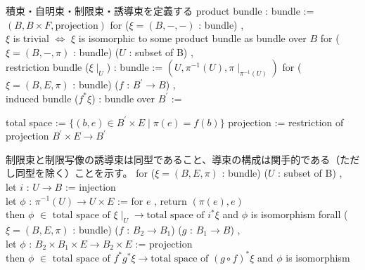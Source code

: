 \begin{Definition}
\itemnote
  積束・自明束・制限束・誘導束を定義する
\itemdefi 
  product bundle : bundle := \((B , B \times F , \text{projection})\)
\itemdefi
  for (\(\xi = (B , - , -)\) : bundle) ,\\
  \(\xi\) is trivial \(\iff\) \(\xi\) is isomorphic to some product bundle as bundle over \(B\)
\itemdefi
  for (\(\xi = (B , - , \pi)\) : bundle) (\(U\) : subset of B) ,\\
  restriction bundle (\(\xi \mid_{U}\)) : bundle := \((U , \pi^{-1}(U) , \pi \mid_{\pi^{-1}(U)})\)
\itemdefi
  for (\(\xi = (B , E , \pi)\) : bundle) (\(f\) : \(B^{\prime} \to B\)) ,\\
  induced bundle (\(f^*\xi\)) : bundle over \(B^{\prime}\) :=
  \begin{itemize}
    \itemenum total space := \(\{(b , e) \in B^{\prime} \times E \mid \pi(e) = f(b)\}\)
    \itemenum projection := restriction of projection \(B^{\prime} \times E \to B^{\prime}\)
  \end{itemize}
\end{Definition}

\begin{Theorem}
\itemnote
  制限束と制限写像の誘導束は同型であること、導束の構成は関手的である（ただし同型を除く）ことを示す。
\itemprop
  for (\(\xi = (B , E ,\pi)\) : bundle) (\(U\) : subset of B) ,\\
  let \(i\) : \(U \to B\) := injection \\
  let \(\phi\) : \(\pi^{-1}(U) \to U \times E\) := for \(e\) , return \((\pi(e) , e)\) \\
  then \(\phi\) \(\in\) \(\text{total space of } \xi \mid_{U} \to \text{total space of } i^*\xi\) and 
  \(\phi\) is isomorphism
\itemprop
  forall (\(\xi = (B , E , \pi)\) : bundle) (\(f\) : \(B_2 \to B_1\)) (\(g\) : \(B_1 \to B\)) ,\\
  let \(\phi\) : \(B_2 \times B_1 \times E \to B_2 \times E\) := projection \\
  then \(\phi\) \(\in\) \(\text{total space of } f^*g^* \xi \to \text{total space of } (g \circ f)^* \xi\) and
  \(\phi\) is isomorphism
\end{Theorem}

\begin{Proof}
\itemprof
  \ADMIT
\itemprof
  \ADMIT
\end{Proof}

